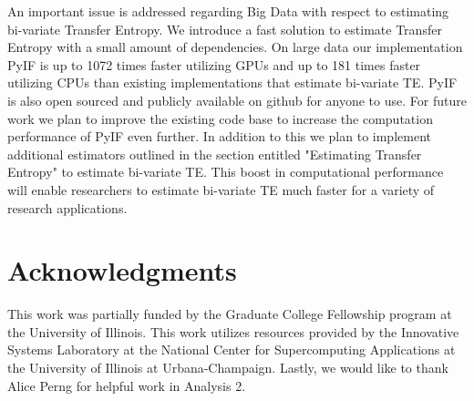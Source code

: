 \documentclass[conference]{IEEEtran}
\begin{document}
An important issue is addressed regarding Big Data with respect to estimating bi-variate Transfer Entropy. We introduce a fast solution to estimate Transfer Entropy with a small amount of dependencies. On large data our implementation PyIF is up to 1072 times faster utilizing GPUs and up to 181 times faster utilizing CPUs than existing implementations that estimate bi-variate TE. PyIF is also open sourced and publicly available on github for anyone to use.  For future work we plan to improve the existing code base to increase the computation performance of PyIF even further. In addition to this we plan to implement additional estimators outlined in the section entitled "Estimating Transfer Entropy" to estimate bi-variate TE. This boost in computational performance will enable researchers to estimate bi-variate TE much faster for a variety of research applications. 

\section*{Acknowledgments}
This work was partially funded by the Graduate College Fellowship program at the University of Illinois. This work utilizes resources provided by the Innovative Systems Laboratory at the National Center for Supercomputing Applications at the University of Illinois at Urbana-Champaign. Lastly, we would like to thank Alice Perng for helpful work in Analysis 2.
\end{document}
